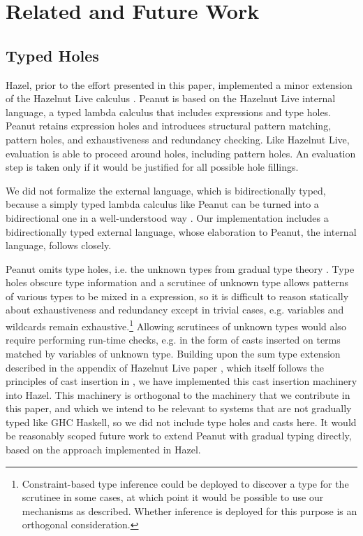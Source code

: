 \section{Related and Future Work}

\subsection{Typed Holes}
Hazel, prior to the effort presented in this paper, implemented a minor extension of the Hazelnut Live calculus \cite{DBLP:journals/pacmpl/OmarVCH19}. Peanut is based on the Hazelnut Live internal language, a typed lambda calculus that includes expressions and type holes. 
Peanut retains expression holes and introduces   
structural pattern matching, pattern holes, and exhaustiveness and redundancy checking. 
Like Hazelnut Live, evaluation is able to proceed around holes, including pattern holes. An evaluation step is taken 
only if it would be justified for all possible hole fillings.

We did not formalize the external language, which is bidirectionally typed, because a simply typed lambda calculus like Peanut can be turned into a bidirectional one in a well-understood way \cite{DBLP:journals/csur/DunfieldK21}. Our implementation includes a bidirectionally typed external language, whose elaboration to Peanut, the internal language, follows \citet{DBLP:journals/pacmpl/OmarVCH19} closely.

Peanut omits type holes, i.e. the unknown types from gradual type theory \cite{Siek2006, DBLP:conf/snapl/SiekVCB15}. Type holes obscure type information and a scrutinee of unknown type allows patterns of various types to be mixed in a  expression, so it 
is difficult to reason statically about exhaustiveness and redundancy except in trivial cases, e.g. variables and wildcards remain exhaustive.\footnote{Constraint-based type inference could be deployed to discover a type for the scrutinee in some cases, at which point it would be possible to use our mechanisms as described. Whether inference is deployed for this purpose is an orthogonal consideration.}
Allowing scrutinees of unknown types would also require performing run-time checks, e.g. in the form of casts inserted on terms matched by variables of unknown type. 
Building upon the sum type extension described in the appendix of Hazelnut Live paper \cite{DBLP:journals/pacmpl/OmarVCH19}, which itself follows the principles of cast insertion in \citet{DBLP:conf/snapl/SiekVCB15},
we have implemented this cast insertion machinery into Hazel.
This machinery is orthogonal to the machinery that we contribute in this paper, and which we intend to be relevant to systems that are not gradually typed like {GHC Haskell}, so we did not include type holes and casts here. It would be reasonably scoped future work to extend Peanut with gradual typing directly, based on the approach implemented in Hazel.

